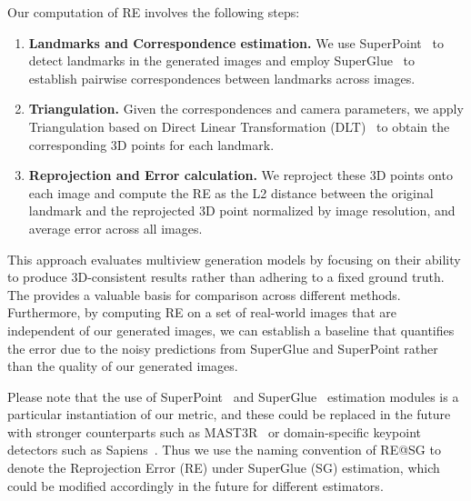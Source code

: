 Our computation of RE involves the following steps:
\begin{enumerate}
    \item \textbf{Landmarks and Correspondence estimation.} We use SuperPoint~\cite{detone2018superpoint} to detect landmarks in the generated images and employ SuperGlue~\cite{sarlin2020superglue} to establish pairwise correspondences between landmarks across images.
    \item \textbf{Triangulation.} Given the correspondences and camera parameters, we apply Triangulation based on Direct Linear Transformation (DLT)~\cite{Hartley2004} to obtain the corresponding 3D points for each landmark.
    \item \textbf{Reprojection and Error calculation.} We reproject these 3D points onto each image and compute the RE as the L2 distance between the original landmark and the reprojected 3D point normalized by image resolution, and average error across all images. 
\end{enumerate}
This approach evaluates multiview generation models by focusing on their ability to produce 3D-consistent results rather than adhering to a fixed ground truth. 
The \reprojectionerror provides a valuable basis for comparison across different methods. Furthermore, by computing RE on a set of real-world images that are independent of our generated images, we can establish a baseline that quantifies the error due to the noisy predictions from SuperGlue and SuperPoint rather than the quality of our generated images.

 Please note that the use of SuperPoint~\cite{detone2018superpoint} and SuperGlue~\cite{sarlin2020superglue} estimation modules is a particular instantiation of our metric, and these could be replaced in the future with stronger counterparts such as MAST3R~\cite{dust3r_cvpr24,mast3r_arxiv24} or domain-specific keypoint detectors such as Sapiens~\cite{khirodkar2025sapiens}. Thus we use the naming convention of RE@SG to denote the Reprojection Error (RE) under SuperGlue (SG) estimation, which could be modified accordingly in the future for different estimators. 
























    
    
    


    

    
    
    

